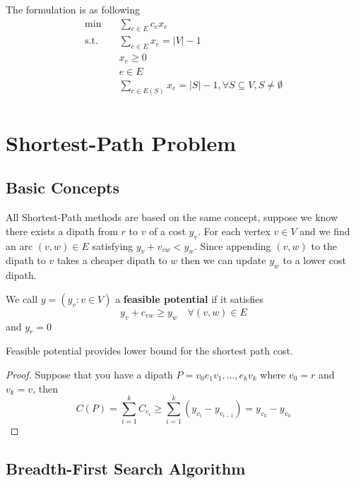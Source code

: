 			The formulation is as following
			\begin{align}
				\min \quad & \sum_{e\in E} c_ex_e \\
				\text{s.t.} \quad & \sum_{e\in E} x_e = |V| - 1 \\
				                  & x_e \ge 0\\
				                  & e\in E \\
				                  & \sum_{e\in E(S)} x_e = |S| - 1, \forall S\subseteq V, S\ne \emptyset \\
			\end{align}

	\chapter{Shortest-Path Problem}
		\section{Basic Concepts}
			All Shortest-Path methods are based on the same concept, suppose we know there exists a dipath from $r$ to $v$ of a cost $y_v$. For each vertex $v \in V$ and we find an arc $(v, w) \in E$ satisfying $y_v + v_{vw} < y_w$. Since appending $(v, w)$ to the dipath to $v$ takes a cheaper dipath to $w$ then we can update $y_w$ to a lower cost dipath.

			\begin{definition}
				We call $y = (y_v: v\in V)$ a \textbf{feasible potential} if it satisfies
				\begin{equation}
					y_v + c_{vw} \ge y_w \quad \forall (v, w) \in E
				\end{equation}
				and $y_r = 0$
			\end{definition}			

			\begin{proposition}
				Feasible potential provides lower bound for the shortest path cost.
			\end{proposition}

			\begin{proof}
				Suppose that you have a dipath $P = v_0e_1v_1,...,e_kv_k$ where $v_0 = r$ and $v_k = v$, then
				\begin{equation}
					C(P) = \sum_{i=1}^k C_{e_i} \ge \sum_{i=1}^k(y_{v_i} - y_{v_{i-1}}) = y_{v_k} - y_{v_0}
				\end{equation}
			\end{proof}

		\section{Breadth-First Search Algorithm}

